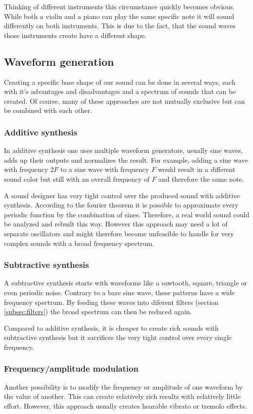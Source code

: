 		Thinking of different instruments this circumstance quickly becomes obvious. 
		While both a violin and a piano can play the same specific note it will sound differently on both instruments.
		This is due to the fact, that the sound waves those instruments create have a different shape.
		
		\subsection{Waveform generation}
		Creating a specific base shape of our sound can be done in several ways, each with it's advantages and disadvantages and a spectrum of sounds that can be created.
		Of course, many of these approaches are not mutually exclusive but can be combined with each other.
		\subsubsection{Additive synthesis}
			In additive synthesis one uses multiple waveform generators, usually sine waves, adds up their outputs and normalizes the result.
			For example, adding a sine wave with frequency $2F$ to a sine wave with frequency $F$ would result in a different sound color but still with an overall frequency of $F$ and therefore the same note.
			
			A sound designer has very tight control over the produced sound with additive synthesis.
			According to the fourier theorem it is possible to approximate every periodic function by the combination of sines. 
			Therefore, a real world sound could be analyzed and rebuilt this way.
			However this approach may need a lot of separate oscillators and might therefore become unfeasible to handle for very complex sounds with a broad frequency spectrum.
		\subsubsection{Subtractive synthesis}
			A subtractive synthesis starts with waveforms like a sawtooth, square, triangle or even periodic noise.
			Contrary to a bare sine wave, these patterns have a wide frequency spectrum. 
			By feeding these waves into diferent filters (section \ref{subsec:filters}) the broad spectrum can then be reduced again. 
			
			Compared to additive synthesis, it is cheaper to create rich sounds with subtractive synthesis but it sacrifices the very tight control over every single frequency.
		\subsubsection{Frequency/amplitude modulation}
			Another possibility is to modify the frequency or amplitude of one waveform by the value of another.
			This can create relatively rich results with relatively little effort.
			However, this approach usually creates hearable vibrato or tremolo effects.

